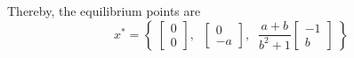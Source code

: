 Thereby, the equilibrium points are
\begin{equation*}
    \boxed{
        x^* =
        \left \{ \;
        \begin{bmatrix}
            0 \\
            0
        \end{bmatrix}, \; \;
        \begin{bmatrix}
            0 \\
            -a
        \end{bmatrix}, \; \;
        \frac{a+b}{b^2 + 1}
        \begin{bmatrix}
            -1 \\
            b
        \end{bmatrix} \;
        \right \}
    }
\end{equation*}
